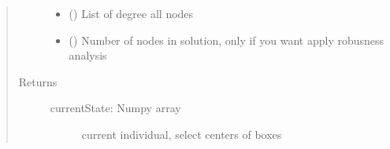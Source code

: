 \documentclass[letterpaper,10pt,english]{sphinxmanual}
\begin{document}
\begin{fulllineitems}
\begin{quote}
\begin{description}
\begin{itemize}
\item {} 
 () \textendash{} List of degree all nodes

\item {} 
 () \textendash{} Number of nodes in solution, only if you want apply robusness analysis

\end{itemize}

\item[{Returns}] \leavevmode
\begin{description}
\item[{currentState: Numpy array}] \leavevmode
current individual, select centers of boxes

\end{description}


\end{description}\end{quote}

\end{fulllineitems}

\end{document}
